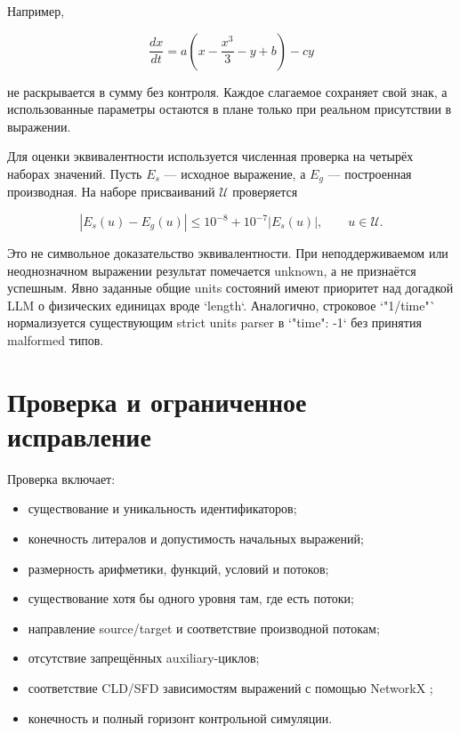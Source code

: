 Например,

\begin{equation}
    \frac{dx}{dt}=a\left(x-\frac{x^3}{3}-y+b\right)-cy
\end{equation}

не раскрывается в сумму без контроля. Каждое слагаемое сохраняет свой знак, а использованные параметры остаются в плане только при реальном присутствии в выражении.

Для оценки эквивалентности используется численная проверка на четырёх наборах значений. Пусть $E_s$ --- исходное выражение, а $E_g$ --- построенная производная. На наборе присваиваний $\mathcal U$ проверяется

\begin{equation}
    \left|E_s(u)-E_g(u)\right|\leq 10^{-8}+10^{-7}|E_s(u)|,\qquad u\in\mathcal U.
    \label{eq:numerical-equivalence}
\end{equation}

Это не символьное доказательство эквивалентности. При неподдерживаемом или неоднозначном выражении результат помечается unknown, а не признаётся успешным. Явно заданные общие units состояний имеют приоритет над догадкой LLM о физических единицах вроде `length`. Аналогично, строковое `"1/time"` нормализуется существующим strict units parser в `{"time": -1}` без принятия malformed типов.

\section{Проверка и ограниченное исправление}

Проверка включает:

\begin{itemize}
    \item существование и уникальность идентификаторов;
    \item конечность литералов и допустимость начальных выражений;
    \item размерность арифметики, функций, условий и потоков;
    \item существование хотя бы одного уровня там, где есть потоки;
    \item направление source/target и соответствие производной потокам;
    \item отсутствие запрещённых auxiliary-циклов;
    \item соответствие CLD/SFD зависимостям выражений с помощью NetworkX \cite{networkx2008};
    \item конечность и полный горизонт контрольной симуляции.
\end{itemize}

